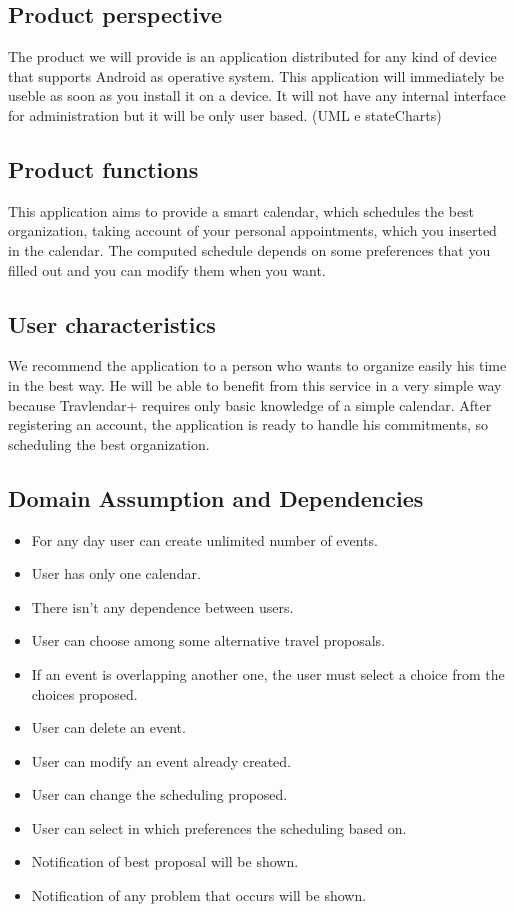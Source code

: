 \subsection{Product perspective} 
The product we will provide is an application distributed for any kind of device that supports Android as operative system. This application will immediately be useble as soon as you install it on a device.
It will not have any internal interface for administration but it will be only user based.
(UML e stateCharts)

\subsection{Product functions}
This application aims to provide a smart calendar, which schedules the best organization, taking account of your personal appointments, which you inserted in the calendar. The computed schedule depends on some preferences that you filled out and you can modify them when you want.
\subsection{User characteristics}
We recommend the application to a person who wants to organize easily his time in the best way. He will be able to benefit from this service in a very simple way because Travlendar+ requires only basic knowledge of a simple calendar. After registering an account, the application is ready to handle his commitments, so scheduling the best organization.
\subsection{Domain Assumption and Dependencies}
\begin{itemize}
	\item For any day user can create unlimited number of events.
	\item User has only one calendar.
	\item There isn’t any dependence between users.
	\item User can choose among some alternative travel proposals.
	\item If an event is overlapping another one, the user must select a choice from the choices proposed.
	\item User can delete an event.
	\item User can modify an event already created.
	\item User can change the scheduling proposed.
	\item User can select in which preferences the scheduling based on.
	\item Notification of best proposal will be shown.
	\item Notification of any problem that occurs will be shown.
\end{itemize}
